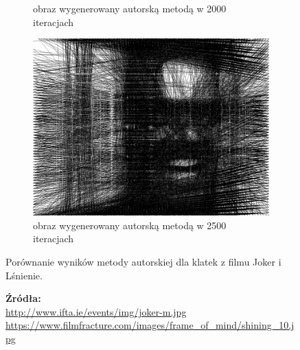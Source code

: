 \begin{figure}[H]
\begin{subfigure}{0.26\textwidth}
            \caption{obraz wygenerowany autorską metodą w 2000 iteracjach}
            \label{comp-comp-joker-shining-g}
        \end{subfigure}
        \begin{subfigure}{0.26\textwidth}
            \centering
            \includegraphics[width = \textwidth]{img/6-comp/shining_r_i2500_c20_inv0_bg10_obj1_ed1.png}
            \caption{obraz wygenerowany autorską metodą w 2500 iteracjach}
            \label{comp-comp-joker-shining-h}
        \end{subfigure}
        \caption{Porównanie wyników metody autorskiej dla klatek z filmu Joker i Lśnienie.}
        \caption*{\footnotesize{\textbf{Źródła:}\\
        \url{http://www.ifta.ie/events/img/joker-m.jpg}\\
        {\url{https://www.filmfracture.com/images/frame_of_mind/shining_10.jpg}}}}
        \label{comp-comp-joker-shining}
        \end{figure}
        
